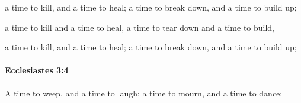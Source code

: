 			\begin{versebox}
					\item[BHS] 
					\item[LXX] 
					\item[ASV] a time to kill, and a time to heal; a time to break down, and a time to build up;
					\item[NIV] a time to kill and a time to heal, a time to tear down and a time to build,
					\item[NRSV] a time to kill, and a time to heal; a time to break down, and a time to build up;
			\end{versebox}

		\paragraph{Ecclesiastes 3:4} %
			\label{ECCLESIASTES-3-4}

			A time to weep, and a time to laugh; a time to mourn, and a time to dance;


